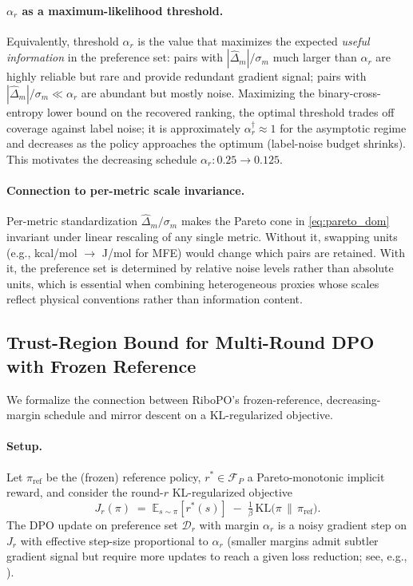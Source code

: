 {{\paragraph{$\alpha_r$ as a maximum-likelihood threshold.}
Equivalently, threshold $\alpha_r$ is the value that maximizes the expected \emph{useful information} in the preference set: pairs with $|\hat\Delta_m|/\sigma_m$ much larger than $\alpha_r$ are highly reliable but rare and provide redundant gradient signal; pairs with $|\hat\Delta_m|/\sigma_m \ll \alpha_r$ are abundant but mostly noise. Maximizing the binary-cross-entropy lower bound on the recovered ranking, the optimal threshold trades off coverage against label noise; it is approximately $\alpha_r^\dagger \approx 1$ for the asymptotic regime and decreases as the policy approaches the optimum (label-noise budget shrinks). This motivates the decreasing schedule $\alpha_r: 0.25 \to 0.125$.

\paragraph{Connection to per-metric scale invariance.}
Per-metric standardization $\hat\Delta_m/\sigma_m$ makes the Pareto cone in \eqref{eq:pareto_dom} invariant under linear rescaling of any single metric. Without it, swapping units (e.g., kcal/mol $\to$ J/mol for MFE) would change which pairs are retained. With it, the preference set is determined by relative noise levels rather than absolute units, which is essential when combining heterogeneous proxies whose scales reflect physical conventions rather than information content.


\subsection{Trust-Region Bound for Multi-Round DPO with Frozen Reference}
\label{app:trust_region}

We formalize the connection between RiboPO's frozen-reference, decreasing-margin schedule and mirror descent on a KL-regularized objective.

\paragraph{Setup.}
Let $\pi_{\mathrm{ref}}$ be the (frozen) reference policy, $r^* \in \mathcal{F}_P$ a Pareto-monotonic implicit reward, and consider the round-$r$ KL-regularized objective
\begin{equation}
J_r(\pi) \;=\; \mathbb{E}_{s\sim \pi}[r^*(s)] \;-\; \tfrac{1}{\beta}\,\mathrm{KL}\big(\pi \,\|\, \pi_{\mathrm{ref}}\big).
\label{eq:kl_obj}
\end{equation}
The DPO update on preference set $\mathcal{D}_r$ with margin $\alpha_r$ is a noisy gradient step on $J_r$ with effective step-size proportional to $\alpha_r$ (smaller margins admit subtler gradient signal but require more updates to reach a given loss reduction; see, e.g., \citep{rafailov2023direct,Pan2025WhatMI}).

}}
